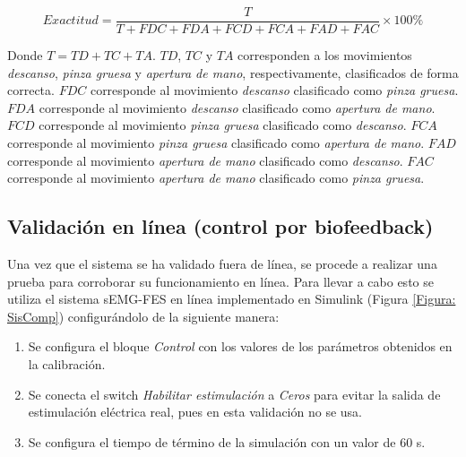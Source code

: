 \begin{equation}
	Exactitud = \frac{T}{T+FDC+FDA+FCD+FCA+FAD+FAC}\times100\%
	\label{Ecu: Exactitud}
\end{equation}

Donde $T = TD+TC+TA$. $TD$, $TC$ y $TA$ corresponden a los movimientos \emph{descanso}, \emph{pinza gruesa} y \emph{apertura de mano}, respectivamente, clasificados de forma correcta. $FDC$ corresponde al movimiento \emph{descanso} clasificado como \emph{pinza gruesa}. $FDA$ corresponde al movimiento \emph{descanso} clasificado como \emph{apertura de mano}. $FCD$ corresponde al movimiento \emph{pinza gruesa} clasificado como \emph{descanso}. $FCA$ corresponde al movimiento \emph{pinza gruesa} clasificado como \emph{apertura de mano}. $FAD$ corresponde al movimiento \emph{apertura de mano} clasificado como \emph{descanso}. $FAC$ corresponde al movimiento \emph{apertura de mano} clasificado como \emph{pinza gruesa}.

\subsection{Validación en línea (control por biofeedback)}

Una vez que el sistema se ha validado fuera de línea, se procede a realizar una prueba para corroborar su funcionamiento en línea. Para llevar a cabo esto se utiliza el sistema sEMG-FES en línea implementado en Simulink\textregistered \; (Figura \ref{Figura: SisComp}) configurándolo de la siguiente manera:

\begin{enumerate}
	\item Se configura el bloque \emph{Control} con los valores de los parámetros obtenidos en la calibración.
	\item Se conecta el switch \emph{Habilitar estimulación} a \emph{Ceros} para evitar la salida de estimulación eléctrica real, pues en esta validación no se usa.
	\item Se configura el tiempo de término de la simulación con un valor de 60 s.
\end{enumerate}

